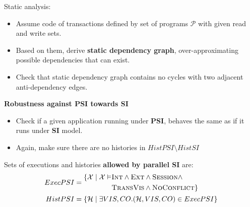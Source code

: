 \documentclass{beamer}
\begin{document}
\begin{frame}
	Static analysis:
	\begin{itemize}
		\item Assume code of transactions defined by set of programs $\mathcal{P}$ with given read and write sets.
		\item Based on them, derive \textbf{static dependency graph}, over-approximating possible dependencies that can exist.
		\item Check that static dependency graph contains no cycles with two adjacent anti-dependency edges.
	\end{itemize}
\end{frame}

\begin{frame}
	\textbf{Robustness against PSI towards SI} \\
	\begin{itemize}
		\item Check if a given application running under \textbf{PSI}, behaves the same as if it runs under \textbf{SI} model.
		\item Again, make sure there are no histories in $HistPSI \setminus HistSI$
	\end{itemize}
\end{frame}

\begin{frame}
	\begin{definition}
		Sets of executions and histories \textbf{allowed by parallel SI} are:
		$$
		\begin{aligned}
		ExecPSI = {} &
		\begin{aligned}
			\{
				\mathcal{X} \mid
				\mathcal{X} \vDash & \textsc{Int} \wedge \textsc{Ext} \wedge \textsc{Session} \wedge \\
				& \textsc{TransVis} \wedge \textsc{NoConflict}
			\}
		\end{aligned}
		\\
		HistPSI = {} & \{ \mathcal{H} \mid \exists VIS, CO. (\mathcal{H}, VIS, CO) \in ExecPSI \}
		\end{aligned}
		$$
	\end{definition}

\end{frame}
\end{document}
